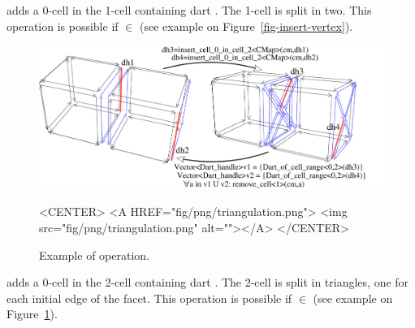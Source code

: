 {} adds a 0-cell in
the 1-cell containing dart . The 1-cell is split in two. This
operation is possible if $\in$ (see
example on Figure~\ref{fig-insert-vertex}).

\begin{figure}[htb]
  \begin{ccTexOnly}
    \centerline{\includegraphics[width=.85\textwidth]
      {Combinatorial_map/fig/pdf/triangulation}}
  \end{ccTexOnly}
  \begin{ccHtmlOnly}
    <CENTER> <A HREF="fig/png/triangulation.png"> <img
    src="fig/png/triangulation.png" alt=""></A> </CENTER>
  \end{ccHtmlOnly}
  \caption{Example of  operation.}
  \label{fig-triangulate}
\end{figure}
   adds a 0-cell in
  the 2-cell containing dart . The 2-cell is split in
  triangles, one for each initial edge of the facet. This operation
  is possible if $\in$ (see example on
  Figure~\ref{fig-triangulate}).

